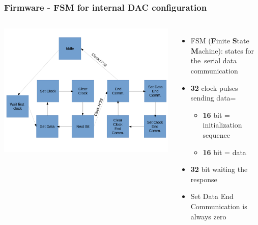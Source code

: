 \documentclass[aspectratio=169]{beamer}
\begin{document}
	\begin{frame}[fragile]
		\frametitle{Firmware - FSM for internal DAC configuration}
		\begin{columns}
			\begin{center}
				\includegraphics[width=0.95 \textwidth]{IMG/FSM.pdf}
			\end{center}
			\begin{itemize}
				\item FSM (\textbf{F}inite \textbf{S}tate \textbf{M}achine): states for the~serial data communication
				\item \textbf{32} clock pulses sending data=
				\begin{itemize}
					\item \textbf{16} bit = initialization sequence
					\item \textbf{16} bit = data
				\end{itemize}
				\item \textbf{32} bit waiting the response
				\item Set Data End Communication is always zero
			\end{itemize}
		\end{columns}
	\end{frame}
\end{document}
